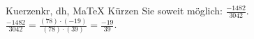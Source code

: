 \begin{MAufgabe}{Kuerzen}{kr, dh, MaTeX}
K\"urzen Sie soweit m\"oglich: $\frac{-1482}{3042}$.\\ 
\ifLsg\MLoesung
\quad $\frac{-1482}{3042}=\frac{(78)\cdot(-19)}{(78)\cdot(39)}=\frac{-19}{39}$.\else\relax\fi
 \end{MAufgabe}